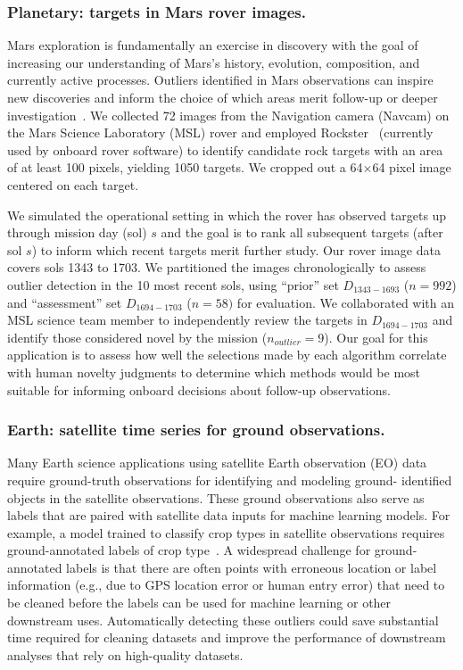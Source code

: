 \documentclass[letterpaper]{article} %
\begin{document}
\subsubsection{Planetary: targets in Mars rover images.}
Mars exploration is fundamentally an exercise in discovery with the
goal of increasing our understanding of Mars's history, evolution,
composition, and currently active processes.  Outliers
identified in Mars observations can inspire new discoveries and inform
the choice of which areas merit follow-up or deeper
investigation~\cite{kerner2020comparison,wagstaff:rover-novelty20}.
We collected \num{72} images from the Navigation camera (Navcam) 
on the Mars Science Laboratory (MSL) rover
and employed Rockster~\cite{burl:rockster16}
(currently used by onboard rover software) to identify candidate rock
targets with an area of at least 100 pixels, yielding \num{1050}
targets.  We cropped out a \num{64}$\times$\num{64} pixel image
centered on each target.

We simulated the operational setting in which the rover has observed
targets up through mission day (sol) $s$ and the goal is to rank all
subsequent targets (after sol $s$) to inform which recent targets
merit further study.  Our rover image data covers sols \num{1343}
to \num{1703}.  We partitioned the images chronologically to assess
outlier detection in the 10 most recent sols, using ``prior'' set
$D_{1343-1693}$ ($n=992$) and ``assessment'' set $D_{1694-1703}$
($n=58)$ for evaluation. We collaborated with an MSL science team member to
independently review the targets in $D_{1694-1703}$ and identify those
considered novel by the mission ($n_{outlier} = 9$).  Our goal for
this application is to assess how well the selections made by each
algorithm correlate with human novelty judgments to determine which
methods would be most suitable for informing onboard decisions about
follow-up observations.

\subsubsection{Earth: satellite time series for ground observations.}
Many Earth science applications using satellite Earth observation (EO) data
 require ground-truth observations for identifying and modeling ground-
 identified objects in the satellite observations. These ground observations
 also serve as labels that are paired with satellite data inputs for machine 
 learning models. For example, a model trained to classify crop types in
 satellite observations requires ground-annotated labels of crop type~\cite{tseng2021learning}. A widespread challenge for ground-
 annotated labels is that there are often points with erroneous location or 
 label information (e.g., due to GPS location error or human entry error) that
 need to be cleaned before the labels can be used for machine learning or
 other downstream uses. Automatically detecting these outliers could save 
 substantial time required for cleaning datasets and improve the performance of
 downstream analyses that rely on high-quality datasets. 
 
\end{document}

